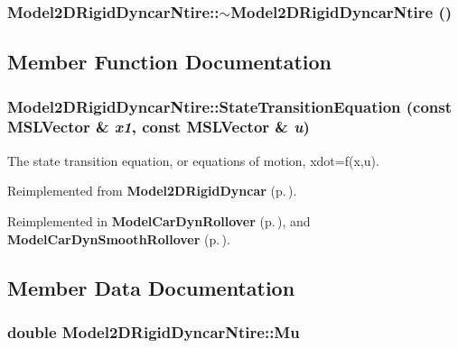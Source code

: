 \subsubsection{\setlength{\rightskip}{0pt plus 5cm}Model2DRigid\-Dyncar\-Ntire::$\sim$Model2DRigid\-Dyncar\-Ntire ()\hspace{0.3cm}{\tt  [inline, virtual]}}\label{classModel2DRigidDyncarNtire_a1}




\subsection{Member Function Documentation}
\subsubsection{ Model2DRigid\-Dyncar\-Ntire::State\-Transition\-Equation (const {\bf MSLVector} \& {\em x1}, const {\bf MSLVector} \& {\em u})\hspace{0.3cm}{\tt  [virtual]}}\label{classModel2DRigidDyncarNtire_a2}


The state transition equation, or equations of motion, xdot=f(x,u).



Reimplemented from {\bf Model2DRigid\-Dyncar} {\rm (p.\,\pageref{classModel2DRigidDyncar_a4})}.

Reimplemented in {\bf Model\-Car\-Dyn\-Rollover} {\rm (p.\,\pageref{classModelCarDynRollover_a3})}, and {\bf Model\-Car\-Dyn\-Smooth\-Rollover} {\rm (p.\,\pageref{classModelCarDynSmoothRollover_a2})}.

\subsection{Member Data Documentation}
\subsubsection{\setlength{\rightskip}{0pt plus 5cm}double Model2DRigid\-Dyncar\-Ntire::Mu}\label{classModel2DRigidDyncarNtire_m0}


